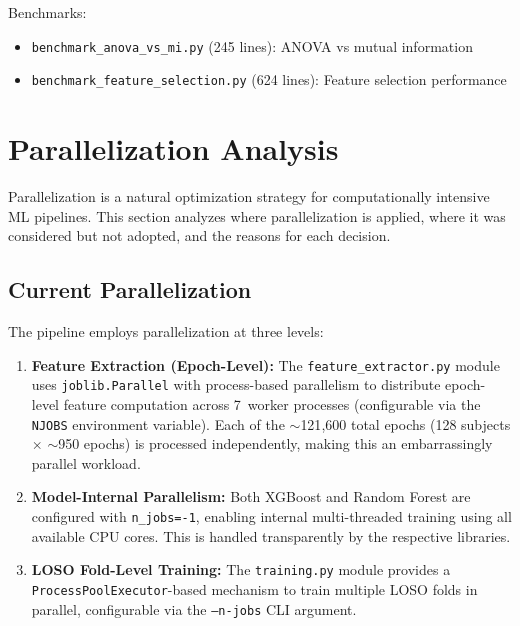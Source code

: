 Benchmarks:

\begin{itemize}
    \item \texttt{benchmark\_anova\_vs\_mi.py} (245 lines): ANOVA vs mutual information
    \item \texttt{benchmark\_feature\_selection.py} (624 lines): Feature selection performance
\end{itemize}

\section{Parallelization Analysis}
\label{sec:parallelization}

Parallelization is a natural optimization strategy for computationally intensive ML pipelines. This section analyzes where parallelization is applied, where it was considered but not adopted, and the reasons for each decision.

\subsection{Current Parallelization}
\label{subsec:current_parallel}

The pipeline employs parallelization at three levels:

\begin{enumerate}
    \item \textbf{Feature Extraction (Epoch-Level):} The \texttt{feature\_extractor.py} module uses \texttt{joblib.Parallel} with process-based parallelism to distribute epoch-level feature computation across 7~worker processes (configurable via the \texttt{NJOBS} environment variable). Each of the $\sim$121{,}600 total epochs (128 subjects $\times$ $\sim$950 epochs) is processed independently, making this an embarrassingly parallel workload.

    \item \textbf{Model-Internal Parallelism:} Both XGBoost and Random Forest are configured with \texttt{n\_jobs=-1}, enabling internal multi-threaded training using all available CPU cores. This is handled transparently by the respective libraries.

    \item \textbf{LOSO Fold-Level Training:} The \texttt{training.py} module provides a \texttt{ProcessPoolExecutor}-based mechanism to train multiple LOSO folds in parallel, configurable via the \texttt{--n-jobs} CLI argument.
\end{enumerate}

